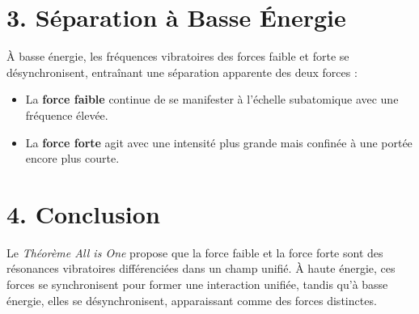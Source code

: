 \documentclass{article}
\begin{document}
\section{3. Séparation à Basse Énergie}

À basse énergie, les fréquences vibratoires des forces faible et forte se désynchronisent, entraînant une séparation apparente des deux forces :
\begin{itemize}
    \item La \textbf{force faible} continue de se manifester à l'échelle subatomique avec une fréquence élevée.
    \item La \textbf{force forte} agit avec une intensité plus grande mais confinée à une portée encore plus courte.
\end{itemize}

\section{4. Conclusion}

Le \textit{Théorème All is One} propose que la force faible et la force forte sont des résonances vibratoires différenciées dans un champ unifié. À haute énergie, ces forces se synchronisent pour former une interaction unifiée, tandis qu'à basse énergie, elles se désynchronisent, apparaissant comme des forces distinctes.
\end{document}

